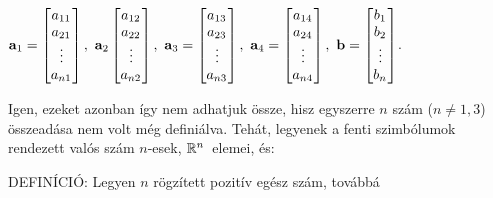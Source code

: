 \documentclass[a4paper,11.5pt]{article}
\begin{document}
	\begin{center}
		$\a_1=
		\begin{bmatrix}
		a_{11}\s \\
		a_{21}\s \\
		\vdots\\
		a_{n1}\s \\
		\end{bmatrix},~\a_2
		\begin{bmatrix}
		a_{12}\s \\
		a_{22}\s \\
		\vdots\\
		a_{n2}\s \\
		\end{bmatrix},~\a_3=
		\begin{bmatrix}
		a_{13}\s \\
		a_{23}\s \\
		\vdots\\
		a_{n3}\s \\
		\end{bmatrix},~\a_4=
		\begin{bmatrix}
		a_{14}\s \\
		a_{24}\s \\
		\vdots\\
		a_{n4}\s \\
		\end{bmatrix},~\b=
		\begin{bmatrix}
		b_{1}\s \\
		b_{2}\s \\
		\vdots\\
		b_{n}\s \\
		\end{bmatrix}$.
	\end{center}
	Igen, ezeket azonban így nem adhatjuk össze, hisz egyszerre $n$ szám ($n \not=1, 3$) összeadása nem volt még definiálva. Tehát, legyenek a fenti szimbólumok rendezett valós szám $n$-esek, $\mathbb{R}^{n}$~elemei, és:
	
	DEFINÍCIÓ: { Legyen} $n$ { rögzített pozitív egész szám, továbbá}
	
\end{document}
